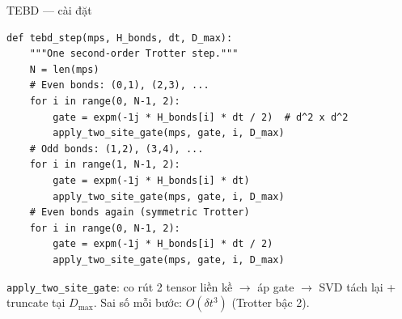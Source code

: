 \documentclass[aspectratio=169, 11pt]{beamer}
\begin{document}
\begin{frame}[fragile, shrink=3]{TEBD --- cài đặt}

\begin{lstlisting}
def tebd_step(mps, H_bonds, dt, D_max):
    """One second-order Trotter step."""
    N = len(mps)
    # Even bonds: (0,1), (2,3), ...
    for i in range(0, N-1, 2):
        gate = expm(-1j * H_bonds[i] * dt / 2)  # d^2 x d^2
        apply_two_site_gate(mps, gate, i, D_max)
    # Odd bonds: (1,2), (3,4), ...
    for i in range(1, N-1, 2):
        gate = expm(-1j * H_bonds[i] * dt)
        apply_two_site_gate(mps, gate, i, D_max)
    # Even bonds again (symmetric Trotter)
    for i in range(0, N-1, 2):
        gate = expm(-1j * H_bonds[i] * dt / 2)
        apply_two_site_gate(mps, gate, i, D_max)
\end{lstlisting}

\vspace{4pt}
{\small\textcolor{dimtext}{\texttt{apply\_two\_site\_gate}: co rút 2 tensor liền kề $\to$ áp gate $\to$ SVD tách lại + truncate tại $D_\text{max}$. Sai số mỗi bước: $O(\delta t^3)$ (Trotter bậc 2).}}

\end{frame}
\end{document}
